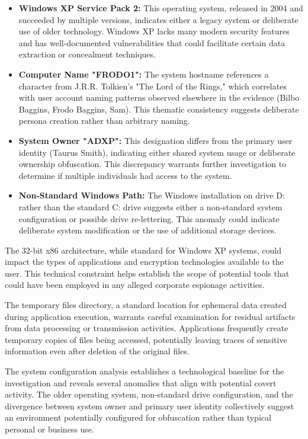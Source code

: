 \begin{itemize}
    \item \textbf{Windows XP Service Pack 2:} This operating system, released in 2004 and succeeded by multiple versions, indicates either a legacy system or deliberate use of older technology. Windows XP lacks many modern security features and has well-documented vulnerabilities that could facilitate certain data extraction or concealment techniques.
    
    \item \textbf{Computer Name "FRODO1":} The system hostname references a character from J.R.R. Tolkien's "The Lord of the Rings," which correlates with user account naming patterns observed elsewhere in the evidence (Bilbo Baggins, Frodo Baggins, Sam). This thematic consistency suggests deliberate persona creation rather than arbitrary naming.
    
    \item \textbf{System Owner "ADXP":} This designation differs from the primary user identity (Taurus Smith), indicating either shared system usage or deliberate ownership obfuscation. This discrepancy warrants further investigation to determine if multiple individuals had access to the system.
    
    \item \textbf{Non-Standard Windows Path:} The Windows installation on drive D: rather than the standard C: drive suggests either a non-standard system configuration or possible drive re-lettering. This anomaly could indicate deliberate system modification or the use of additional storage devices.
\end{itemize}

The 32-bit x86 architecture, while standard for Windows XP systems, could impact the types of applications and encryption technologies available to the user. This technical constraint helps establish the scope of potential tools that could have been employed in any alleged corporate espionage activities.

The temporary files directory, a standard location for ephemeral data created during application execution, warrants careful examination for residual artifacts from data processing or transmission activities. Applications frequently create temporary copies of files being accessed, potentially leaving traces of sensitive information even after deletion of the original files.

The system configuration analysis establishes a technological baseline for the investigation and reveals several anomalies that align with potential covert activity. The older operating system, non-standard drive configuration, and the divergence between system owner and primary user identity collectively suggest an environment potentially configured for obfuscation rather than typical personal or business use.